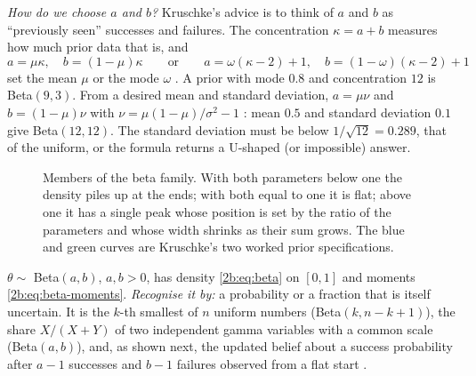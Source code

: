 \emph{How do we choose $a$ and $b$?} Kruschke's advice  is to think of $a$ and $b$ as ``previously seen'' successes and failures. The concentration $\kappa=a+b$ measures how much prior data that is, and
\[
  a=\mu\kappa,\quad b=(1-\mu)\kappa\qquad\text{or}\qquad a=\omega(\kappa-2)+1,\quad b=(1-\omega)(\kappa-2)+1
\]
set the mean $\mu$ or the mode $\omega$ . A prior with mode $0.8$ and concentration $12$ is Beta$(9,3)$. From a desired mean and standard deviation, $a=\mu\nu$ and $b=(1-\mu)\nu$ with $\nu=\mu(1-\mu)/\sigma^2-1$ : mean $0.5$ and standard deviation $0.1$ give Beta$(12,12)$. The standard deviation must be below $1/\sqrt{12}=0.289$, that of the uniform, or the formula returns a U-shaped (or impossible) answer.

\begin{figure}[htbp]
\centering
{}
\caption{Members of the beta family. With both parameters below one the density piles up at the ends; with both equal to one it is flat; above one it has a single peak whose position is set by the ratio of the parameters and whose width shrinks as their sum grows. The blue and green curves are Kruschke's two worked prior specifications.}
\label{2b:fig:beta-shapes}
\end{figure}

\begin{workdef}
$\theta\sim$ Beta$(a,b)$, $a,b>0$, has density \eqref{2b:eq:beta} on $[0,1]$ and moments \eqref{2b:eq:beta-moments}.
\emph{Recognise it by:} a probability or a fraction that is itself uncertain. It is the $k$-th smallest of $n$ uniform numbers (Beta$(k,n-k+1)$), the share $X/(X+Y)$ of two independent gamma variables with a common scale (Beta$(a,b)$), and, as shown next, the updated belief about a success probability after $a-1$ successes and $b-1$ failures observed from a flat start .
\end{workdef}

